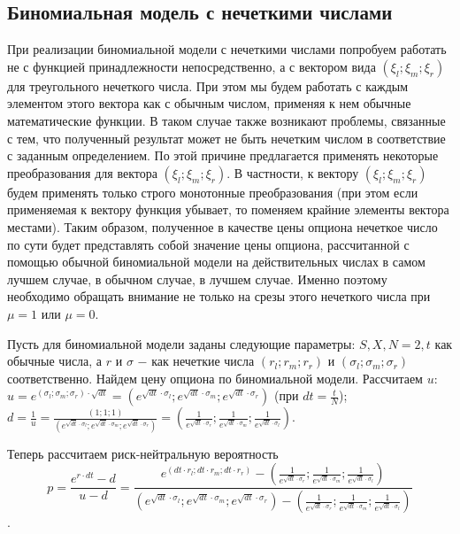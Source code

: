 \documentclass[a4paper, 12pt]{extarticle}
\begin{document}
	\subsection{Биномиальная модель с нечеткими числами}
	При реализации биномиальной модели с нечеткими числами попробуем работать не с функцией принадлежности непосредственно, а с вектором вида $(\xi_l;\xi_m;\xi_r)$ для треугольного нечеткого числа. При этом мы будем работать с каждым элементом этого вектора как с обычным числом, применяя к нем обычные математические функции. В таком случае также возникают проблемы, связанные с тем, что полученный результат может не быть нечетким числом в соответствие с заданным определением. По этой причине предлагается применять некоторые преобразования для вектора $(\xi_l;\xi_m;\xi_r)$. В частности, к вектору $(\xi_l;\xi_m;\xi_r)$ будем применять только строго монотонные преобразования (при этом если применяемая к вектору функция убывает, то поменяем крайние элементы вектора местами). Таким образом, полученное в качестве цены опциона нечеткое число по сути будет представлять собой значение цены опциона, рассчитанной с помощью обычной биномиальной модели на действительных числах в самом лучшем случае, в обычном случае, в лучшем случае. Именно поэтому необходимо обращать внимание не только на срезы этого нечеткого числа при $\mu=1$ или $\mu=0$. 
	
	Пусть для биномиальной модели заданы следующие параметры: $S, X, N=2, t$ как обычные числа, а $r$ и $\sigma$ $-$ как нечеткие числа $(r_l;r_m;r_r)$ и $(\sigma_l;\sigma_m;\sigma_r)$ соответственно. Найдем цену опциона по биномиальной модели. Рассчитаем $u$: 
	$u=e^{(\sigma_l;\sigma_m;\sigma_r) \cdot \sqrt{dt}} = (e^{\sqrt{dt} \cdot \sigma_l};e^{\sqrt{dt} \cdot \sigma_m};e^{\sqrt{dt} \cdot \sigma_r})$ (при $dt=\frac{t}{N}$); 
	$d=\frac{1}{u}=\frac{(1;1;1)}{(e^{\sqrt{dt} \cdot \sigma_l};e^{\sqrt{dt} \cdot \sigma_m};e^{\sqrt{dt} \cdot \sigma_r})}=(\frac{1}{e^{\sqrt{dt} \cdot \sigma_r}};\frac{1}{e^{\sqrt{dt} \cdot \sigma_m}};\frac{1}{e^{\sqrt{dt} \cdot \sigma_l}})$. 
	
	Теперь рассчитаем риск-нейтральную вероятность \[p=\frac{e^{r \cdot dt}-d}{u-d}=\frac{e^{(dt \cdot r_l;dt \cdot r_m;dt \cdot r_r)}-\left(\frac{1}{e^{\sqrt{dt} \cdot \sigma_r}};\frac{1}{e^{\sqrt{dt} \cdot \sigma_m}};\frac{1}{e^{\sqrt{dt} \cdot \sigma_l}}\right)}{(e^{\sqrt{dt} \cdot \sigma_l};e^{\sqrt{dt} \cdot \sigma_m};e^{\sqrt{dt} \cdot \sigma_r})-\left(\frac{1}{e^{\sqrt{dt} \cdot \sigma_r}};\frac{1}{e^{\sqrt{dt} \cdot \sigma_m}};\frac{1}{e^{\sqrt{dt} \cdot \sigma_l}}\right)}\].
	
\end{document}
